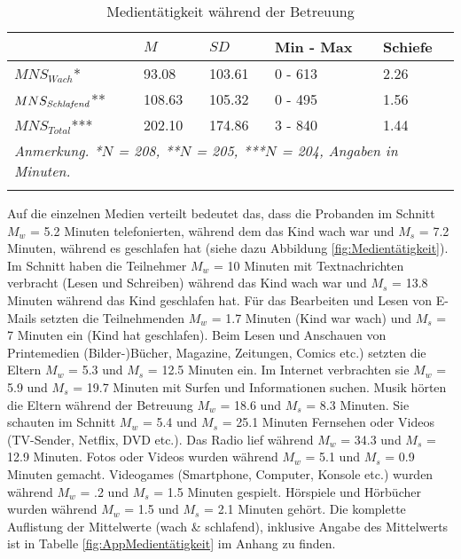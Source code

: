 \begin{table}[hb]
\centering
\captionsetup{margin=50pt, skip=5pt}
\caption{Medientätigkeit während der Betreuung}
\begin{tabular}{m{8em} m{4em}  m{4em}  m{5em} m{4em}} 
  \hline
  & $M$ & $SD$ & Min - Max & Schiefe\\
  \hline
  $MNS_{Wach}$* & 93.08 & 103.61 & 0 - 613 & 2.26\\
  $MNS_{\text{\textit{Schlafend}}}$** & 108.63 & 105.32 & 0 - 495 & 1.56\\
  $MNS_{Total}$*** & 202.10 & 174.86 & 3 - 840 & 1.44 \\
  \hline
  \multicolumn{5}{l}{\textit{Anmerkung. *$N$ = 208, **$N$ = 205, ***$N$ = 204, Angaben in Minuten.}}\\
  &&&&\\
\end{tabular}
\label{table:Medientätigkeit}
\end{table}

Auf die einzelnen Medien verteilt bedeutet das, dass die Probanden im Schnitt $M_{w}$ = 5.2 Minuten telefonierten, während dem das Kind wach war und $M_{s}$ = 7.2 Minuten, während es geschlafen hat (siehe dazu Abbildung \ref{fig:Medientätigkeit}). Im Schnitt haben die Teilnehmer $M_{w}$ = 10 Minuten mit Textnachrichten verbracht (Lesen und Schreiben) während das Kind wach war und $M_{s}$ = 13.8 Minuten während das Kind geschlafen hat. Für das Bearbeiten und Lesen von E-Mails setzten die Teilnehmenden $M_{w}$ = 1.7 Minuten (Kind war wach) und $M_{s}$ = 7 Minuten ein (Kind hat geschlafen). Beim Lesen und Anschauen von Printemedien (Bilder-)Bücher, Magazine, Zeitungen, Comics etc.) setzten die Eltern $M_{w}$ = 5.3 und $M_{s}$ = 12.5 Minuten ein. Im Internet verbrachten sie $M_{w}$ = 5.9 und $M_{s}$ = 19.7 Minuten mit Surfen und Informationen suchen. Musik hörten die Eltern während der Betreuung $M_{w}$ = 18.6 und $M_{s}$ = 8.3 Minuten. Sie schauten im Schnitt $M_{w}$ = 5.4 und $M_{s}$ = 25.1 Minuten Fernsehen oder Videos (TV-Sender, Netflix, DVD etc.). Das Radio lief während $M_{w}$ = 34.3 und $M_{s}$ = 12.9 Minuten. Fotos oder Videos wurden während $M_{w}$ = 5.1 und $M_{s}$ = 0.9 Minuten gemacht. Videogames (Smartphone, Computer, Konsole etc.) wurden während $M_{w}$ = .2 und $M_{s}$ = 1.5 Minuten gespielt. Hörspiele und Hörbücher wurden während $M_{w}$ = 1.5 und $M_{s}$ = 2.1 Minuten gehört. Die komplette Auflistung der Mittelwerte (wach \& schlafend), inklusive Angabe des  Mittelwerts ist in Tabelle \ref{fig:AppMedientätigkeit} im Anhang zu finden.

